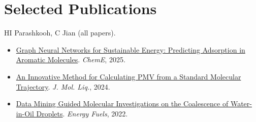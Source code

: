 \documentclass[11pt,a4paper]{article}
\begin{document}
\section{Selected Publications}
{\small HI Parashkooh, C Jian (all papers).
\begin{itemize}[leftmargin=0pt, label={},noitemsep,topsep=2pt]
    \item \href{https://www.mdpi.com/2305-7084/9/4/85}{Graph Neural Networks for Sustainable Energy: Predicting Adsorption in Aromatic Molecules}. \textit{ChemE}, 2025.
    \item \href{https://www.sciencedirect.com/science/article/abs/pii/S0167732223026867}{An Innovative Method for Calculating PMV from a Standard Molecular Trajectory}. \textit{J. Mol. Liq.}, 2024.
    \item \href{https://pubs.acs.org/doi/abs/10.1021/acs.energyfuels.1c03358}{Data Mining Guided Molecular Investigations on the Coalescence of Water-in-Oil Droplets}. \textit{Energy Fuels}, 2022.
\end{itemize}
}
\end{document}

